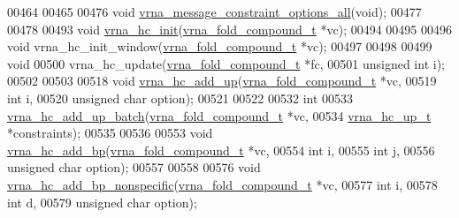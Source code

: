 \begin{DoxyCode}
00464 
00465 
00476 \textcolor{keywordtype}{void} \hyperlink{group__constraints_gaec7e13fa0465c2acc7a621d1aecb709f}{vrna\_message\_constraint\_options\_all}(\textcolor{keywordtype}{void});
00477 
00478 
00493 \textcolor{keywordtype}{void} \hyperlink{group__hard__constraints_ga36ff456c43bf920629cee5a236e4f0ff}{vrna\_hc\_init}(\hyperlink{group__fold__compound_structvrna__fc__s}{vrna\_fold\_compound\_t} *vc);
00494 
00495 
00496 \textcolor{keywordtype}{void} vrna\_hc\_init\_window(\hyperlink{group__fold__compound_structvrna__fc__s}{vrna\_fold\_compound\_t} *vc);
00497 
00498 
00499 \textcolor{keywordtype}{void}
00500 vrna\_hc\_update(\hyperlink{group__fold__compound_structvrna__fc__s}{vrna\_fold\_compound\_t} *fc,
00501                \textcolor{keywordtype}{unsigned} \textcolor{keywordtype}{int}         i);
00502 
00503 
00518 \textcolor{keywordtype}{void} \hyperlink{group__hard__constraints_ga447d88e06ad97bb225cd83310ace8345}{vrna\_hc\_add\_up}(\hyperlink{group__fold__compound_structvrna__fc__s}{vrna\_fold\_compound\_t}  *vc,
00519                     \textcolor{keywordtype}{int}                   i,
00520                     \textcolor{keywordtype}{unsigned} \textcolor{keywordtype}{char}         option);
00521 
00522 
00532 \textcolor{keywordtype}{int}
00533 \hyperlink{group__hard__constraints_ga5070f296c8af2baea10951525519464f}{vrna\_hc\_add\_up\_batch}(\hyperlink{group__fold__compound_structvrna__fc__s}{vrna\_fold\_compound\_t} *vc,
00534                      \hyperlink{group__hard__constraints_structvrna__hc__up__s}{vrna\_hc\_up\_t}         *constraints);
00535 
00536 
00553 \textcolor{keywordtype}{void} \hyperlink{group__hard__constraints_ga7cba95ebe2ceb5ec9a5768f2232854fd}{vrna\_hc\_add\_bp}(\hyperlink{group__fold__compound_structvrna__fc__s}{vrna\_fold\_compound\_t}  *vc,
00554                     \textcolor{keywordtype}{int}                   i,
00555                     \textcolor{keywordtype}{int}                   j,
00556                     \textcolor{keywordtype}{unsigned} \textcolor{keywordtype}{char}         option);
00557 
00558 
00576 \textcolor{keywordtype}{void} \hyperlink{group__hard__constraints_gaed50398ade2d4852c9e82592fe76046c}{vrna\_hc\_add\_bp\_nonspecific}(\hyperlink{group__fold__compound_structvrna__fc__s}{vrna\_fold\_compound\_t}  *vc,
00577                                 \textcolor{keywordtype}{int}                   i,
00578                                 \textcolor{keywordtype}{int}                   d,
00579                                 \textcolor{keywordtype}{unsigned} \textcolor{keywordtype}{char}         option);

\end{DoxyCode}
